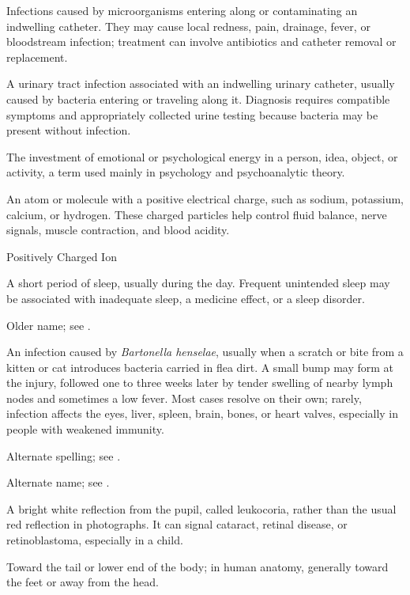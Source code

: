  Infections caused by microorganisms entering along or contaminating an indwelling catheter. They may cause local redness, pain, drainage, fever, or bloodstream infection; treatment can involve antibiotics and catheter removal or replacement.

 A urinary tract infection associated with an indwelling urinary catheter, usually caused by bacteria entering or traveling along it. Diagnosis requires compatible symptoms and appropriately collected urine testing because bacteria may be present without infection.

 The investment of emotional or psychological energy in a person, idea, object, or activity, a term used mainly in psychology and psychoanalytic theory.

 An atom or molecule with a positive electrical charge, such as sodium, potassium, calcium, or hydrogen. These charged particles help control fluid balance, nerve signals, muscle contraction, and blood acidity.

\synonyms
Positively Charged Ion

 A short period of sleep, usually during the day. Frequent unintended sleep may be associated with inadequate sleep, a medicine effect, or a sleep disorder.

 Older name; see .

 An infection caused by \textit{Bartonella henselae}, usually when a scratch or bite from a kitten or cat introduces bacteria carried in flea dirt. A small bump may form at the injury, followed one to three weeks later by tender swelling of nearby lymph nodes and sometimes a low fever. Most cases resolve on their own; rarely, infection affects the eyes, liver, spleen, brain, bones, or heart valves, especially in people with weakened immunity.

 Alternate spelling; see .

 Alternate name; see .

 A bright white reflection from the pupil, called leukocoria, rather than the usual red reflection in photographs. It can signal cataract, retinal disease, or retinoblastoma, especially in a child.

 Toward the tail or lower end of the body; in human anatomy, generally toward the feet or away from the head.

